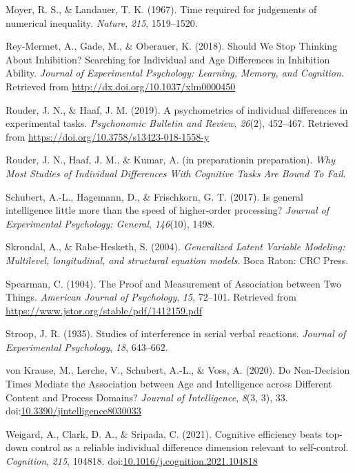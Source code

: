 \documentclass[
  ,man]{apa6}
\newlength{\cslhangindent}
\newlength{\cslentryspacingunit} %
\newenvironment{CSLReferences}[2] %
 {%
  \setlength{\parindent}{0pt}
  \ifodd #1
  \let\oldpar\par
  \def\par{\hangindent=\cslhangindent\oldpar}
  \fi
  \setlength{\parskip}{#2\cslentryspacingunit}
 }%
 {}
\begin{document}
\begin{CSLReferences}{1}{0}
\leavevmode{}%
Moyer, R. S., \& Landauer, T. K. (1967). Time required for judgements of numerical inequality. \emph{Nature}, \emph{215}, 1519--1520.

\leavevmode{}%
Rey-Mermet, A., Gade, M., \& Oberauer, K. (2018). Should {We Stop Thinking About Inhibition}? {Searching} for {Individual} and {Age Differences} in {Inhibition Ability}. \emph{Journal of Experimental Psychology: Learning, Memory, and Cognition}. Retrieved from \url{http://dx.doi.org/10.1037/xlm0000450}

\leavevmode{}%
Rouder, J. N., \& Haaf, J. M. (2019). A psychometrics of individual differences in experimental tasks. \emph{Psychonomic Bulletin and Review}, \emph{26}(2), 452--467. Retrieved from \url{https://doi.org/10.3758/s13423-018-1558-y}

\leavevmode{}%
Rouder, J. N., Haaf, J. M., \& Kumar, A. (in preparationin preparation). \emph{Why {Most Studies} of {Individual Differences With Cognitive Tasks Are Bound To Fail}}.

\leavevmode{}%
Schubert, A.-L., Hagemann, D., \& Frischkorn, G. T. (2017). Is general intelligence little more than the speed of higher-order processing? \emph{Journal of Experimental Psychology: General}, \emph{146}(10), 1498.

\leavevmode{}%
Skrondal, A., \& Rabe-Hesketh, S. (2004). \emph{Generalized {Latent Variable Modeling}: Multilevel, longitudinal, and structural equation models}. {Boca Raton}: {CRC Press}.

\leavevmode{}%
Spearman, C. (1904). The {Proof} and {Measurement} of {Association} between {Two Things}. \emph{American Journal of Psychology}, \emph{15}, 72--101. Retrieved from \url{https://www.jstor.org/stable/pdf/1412159.pdf}

\leavevmode{}%
Stroop, J. R. (1935). Studies of interference in serial verbal reactions. \emph{Journal of Experimental Psychology}, \emph{18}, 643--662.

\leavevmode{}%
von Krause, M., Lerche, V., Schubert, A.-L., \& Voss, A. (2020). Do {Non-Decision Times Mediate} the {Association} between {Age} and {Intelligence} across {Different Content} and {Process Domains}? \emph{Journal of Intelligence}, \emph{8}(3, 3), 33. doi:\href{https://doi.org/10.3390/jintelligence8030033}{10.3390/jintelligence8030033}

\leavevmode{}%
Weigard, A., Clark, D. A., \& Sripada, C. (2021). Cognitive efficiency beats top-down control as a reliable individual difference dimension relevant to self-control. \emph{Cognition}, \emph{215}, 104818. doi:\href{https://doi.org/10.1016/j.cognition.2021.104818}{10.1016/j.cognition.2021.104818}

\end{CSLReferences}
\end{document}
